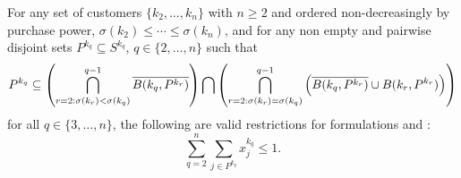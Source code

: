 \begin{theorem}
    \label{thm:xineqs}

    For any set of customers $\{k_2, \ldots, k_n\}$ with $n \geq 2$ and ordered
    non-decreasingly by purchase power, $\sigma(k_2) \leq \cdots \leq
    \sigma(k_n)$, and for any non empty and pairwise disjoint sets $P^{k_q}
    \subseteq S^{k_q}$, $q \in \{2, \ldots, n\}$ such that
    \begin{equation*}
        P^{k_q} \subseteq
                \left(
                    \bigcap_{r=2:\\ \sigma(k_r) < \sigma(k_q)}^{q-1}
                        \overline{B(k_q, P^{k_r})}
                \right)
            \bigcap
                \left(
                    \bigcap_{r=2:\\ \sigma(k_r) = \sigma(k_q)}^{q-1}
                        \left(
                            \overline{B(k_q, P^{k_r})} \cup B(k_r, P^{k_r})
                        \right)
                \right)
    \end{equation*}
    \noindent
    for all $q \in \{3, \ldots, n\}$, the following are valid restrictions for
    formulations \slla and \sllb:
    \begin{equation}
        \label{eqn:xineqs}
        \sum_{q=2}^n \sum_{j \in P^{k_q}} x_j^{k_q} \leq 1.
    \end{equation}
\end{theorem}

